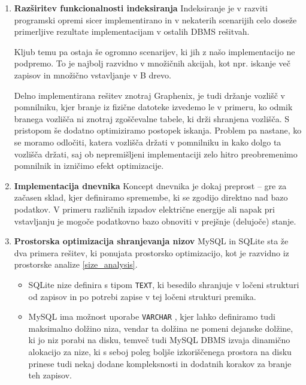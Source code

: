 \documentclass[a4paper,12pt,openright]{book}
\begin{document}
    \begin{enumerate}
        \item \textbf{Razširitev funkcionalnosti indeksiranja}
        \newline
        \noindent
        Indeksiranje je v razviti programski opremi sicer implementirano in v nekaterih scenarijih celo doseže primerljive rezultate implementacijam v ostalih DBMS rešitvah.

        Kljub temu pa ostaja še ogromno scenarijev, ki jih z našo implementacijo ne podpremo. To je najbolj razvidno v množičnih akcijah, kot npr. iskanje več zapisov in množično vstavljanje v B drevo.

        Delno implementirana rešitev znotraj Graphenix, je tudi držanje vozlišč v pomnilniku, kjer branje iz fizične datoteke izvedemo le v primeru, ko odmik branega vozlišča ni znotraj zgoščevalne tabele, ki drži shranjena vozlišča. S pristopom še dodatno optimiziramo postopek iskanja. Problem pa nastane, ko se moramo odločiti, katera vozlišča držati v pomnilniku in kako dolgo ta vozlišča držati, saj ob nepremišljeni implementaciji zelo hitro preobremenimo pomnilnik in izničimo efekt optimizacije.

        \item \textbf{Implementacija dnevnika}
        \newline
        \noindent
        Koncept dnevnika je dokaj preprost – gre za začasen sklad, kjer definiramo spremembe, ki se zgodijo direktno nad bazo podatkov. V primeru različnih izpadov električne energije ali napak pri vstavljanju je mogoče podatkovno bazo obnoviti v prejšnje (delujoče) stanje.

        \item \textbf{Prostorska optimizacija shranjevanja nizov}
        \newline
        \noindent
        MySQL in SQLite sta že dva primera rešitev, ki ponujata prostorsko optimizacijo, kot je razvidno iz prostorske analize \ref{size_analysis}.
        \begin{itemize}
            \item SQLite nize definira s tipom {\tt TEXT}, ki besedilo shranjuje v ločeni strukturi od zapisov in po potrebi zapise v tej ločeni strukturi premika.
            \item MySQL ima možnost uporabe {\tt VARCHAR} \cite{MYSQL_VARCHAR}, kjer lahko definiramo tudi maksimalno dolžino niza, vendar ta dolžina ne pomeni dejanske dolžine, ki jo niz porabi na disku, temveč tudi MySQL DBMS izvaja dinamično alokacijo za nize, ki s seboj poleg boljše izkoriščenega prostora na disku prinese tudi nekaj dodane kompleksnosti in dodatnih korakov za branje teh zapisov.
        \end{itemize}
    \end{enumerate}
    
\end{document}
